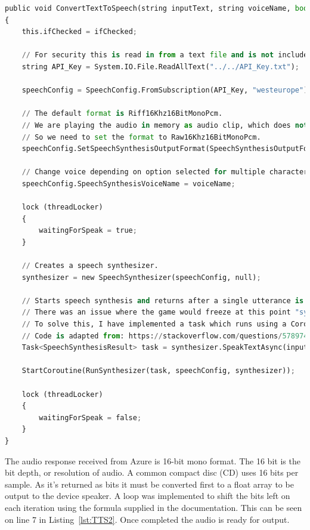 \begin{lstlisting}[caption={Text to Speech - Setup and request},label={lst:TTS1},language=python]
public void ConvertTextToSpeech(string inputText, string voiceName, bool ifChecked)
{
    this.ifChecked = ifChecked;

    // For security this is read in from a text file and is not included on Github. 
    string API_Key = System.IO.File.ReadAllText("../../API_Key.txt");

    speechConfig = SpeechConfig.FromSubscription(API_Key, "westeurope");
    
    // The default format is Riff16Khz16BitMonoPcm.
    // We are playing the audio in memory as audio clip, which does not require riff header.
    // So we need to set the format to Raw16Khz16BitMonoPcm.
    speechConfig.SetSpeechSynthesisOutputFormat(SpeechSynthesisOutputFormat.Raw16Khz16BitMonoPcm);

    // Change voice depending on option selected for multiple characters of different genders and ethnicities.
    speechConfig.SpeechSynthesisVoiceName = voiceName;

    lock (threadLocker)
    {
        waitingForSpeak = true;
    }

    // Creates a speech synthesizer.
    synthesizer = new SpeechSynthesizer(speechConfig, null);

    // Starts speech synthesis and returns after a single utterance is synthesized.
    // There was an issue where the game would freeze at this point "synthesizer.SpeakTextAsync(inputText)" blocks until the task is complete. 
    // To solve this, I have implemented a task which runs using a Coroutine that waits until the result from Azure is returned. 
    // Code is adapted from: https://stackoverflow.com/questions/57897464/unity-freezes-for-2-seconds-while-microsoft-azure-text-to-speech-processes-input
    Task<SpeechSynthesisResult> task = synthesizer.SpeakTextAsync(inputText);

    StartCoroutine(RunSynthesizer(task, speechConfig, synthesizer));

    lock (threadLocker)
    {
        waitingForSpeak = false;
    }
}
\end{lstlisting}

\par
\medskip

The audio response received from Azure is 16-bit mono format. The 16 bit is the bit depth, or resolution of audio. A common compact disc (CD) uses 16 bits per sample. As it's returned as bits it must be converted first to a float array to be output to the device speaker. A loop was implemented to shift the bits left on each iteration using the formula supplied in the documentation. This can be seen on line 7 in Listing~\ref{lst:TTS2}. Once completed the audio is ready for output.

